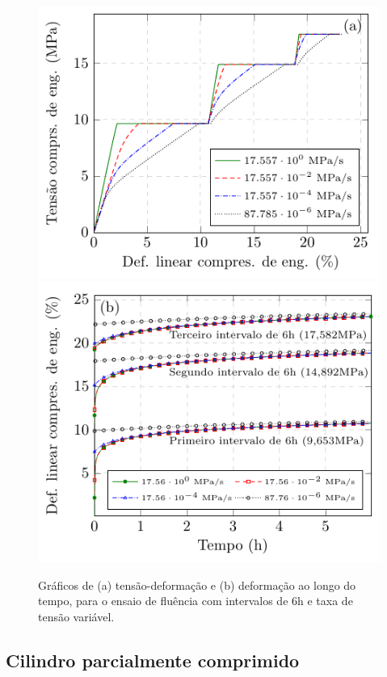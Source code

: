 \documentclass[Tese.tex]{subfiles}
\begin{document}
{\begin{figure}[!htb]
	\centering
	\caption{Gráficos de (a) tensão-deformação e (b) deformação ao longo do tempo, para o ensaio de fluência com intervalos de $6$h e taxa de tensão variável.}
	\label{fig:ptfe-creep-all-rates}
	\includegraphics[scale=1.0]{Figuras/PTFE/creep-all-rates.pdf}\;\;\includegraphics[scale=1.0]{Figuras/PTFE/creep-all-rates-e.pdf}%
\end{figure}

\subsection{Cilindro parcialmente comprimido}\label{subsec:cilindro}

}
\end{document}
